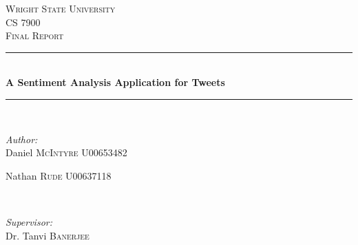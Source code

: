 \begin{titlepage}

\newcommand{\HRule}{\rule{\linewidth}{0.5mm}} %

\center %
 

\textsc{\LARGE Wright State University}\\[1.5cm] %
\textsc{\Large CS 7900}\\[0.5cm] %
\textsc{\large Final Report}\\[0.5cm] %


\HRule \\[0.4cm]
{ \huge \bfseries A Sentiment Analysis Application for Tweets}\\[0.4cm] %
\HRule \\[1.5cm]
 

\begin{minipage}{0.4\textwidth}
\begin{flushleft} \large
\emph{Author:}\\
Daniel \textsc{McIntyre} U00653482 %

Nathan \textsc{Rude} U00637118%

\end{flushleft}
\end{minipage}
~
\begin{minipage}{0.4\textwidth}
\begin{flushright} \large
\emph{Supervisor:} \\
Dr. Tanvi \textsc{Banerjee} %
\end{flushright}
\end{minipage}\\[4cm]


\end{titlepage}
